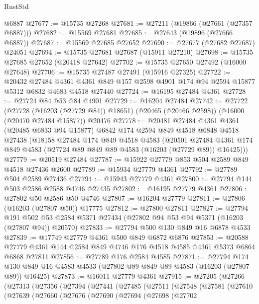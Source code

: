 \begin{lexlean}{RustStd}
\begin{coremodule}
    @6887
@27677 := @15735 @27268
@27681 := @27211 (@19866 (@27661 (@27357 @6887)))
@27682 := @15569 @27681
@27685 := @27643 (@19896 (@27666 @6887))
@27687 := @15569 @27685 @27652
@27690 := @27677 (@27682 @27687) @24051
@27694 := @15735 @27681 @27687 (@15911 @27210)
@27698 := @15735 @27685 @27652 (@20418 @27642)
@27702 := @15735 @27650 @27492 (@16000 @27648)
@27706 := @15735 @27487 @27491 (@15916 @27325)
@27722 := @20432
    @27484
    @4361
    @4361
    @849
    @157
    @2598
    @4901
    @174
    @94
    @2594
    @15877
    @5312
    @6832
    @4683
    @4518
    @27440
@27724 := @16195 @27484 @4361
@27728 := @27724 @84 @53 @84 @4901
@27729 := @16204 @27484
@27742 := @27722
    (@27728 (@16203 (@27729 @84)) @18651)
    (@20465 (@20466 @2598))
    (@16000 (@20470 @27484 @15877))
    @20476
@27778 := @20481
    @27484
    @4361
    @4361
    (@20485 @6833 @94 @15877)
    @6842
    @174
    @2594
    @849
    @4518
    @6848
    @4518
    @27438
    (@18158
      @27484
      @174
      @849
      @4518
      @4583
      (@20501
        @27484
        @4361
        @174
        @849
        @4583
        (@27724 @89 @849 @89 @4583 (@16203 (@27729 @89)) @16425)))
@27779 := @20519 @27484
@27787 := @15922 @27779 @853 @504 @2589 @849 @4518 @27436 @2600
@27789 := @15934 @27779 @4361
@27792 := @27789 @504 @2589 @27436
@27794 := @15943 @27779 @4361
@27800 := @27794 @144 @503 @2586 @2588 @4746 @27435
@27802 := @16195 @27779 @4361
@27806 := @27802 @50 @2586 @50 @4746
@27807 := @16204 @27779
@27811 := @27806 (@16203 (@27807 @50)) @17775
@27812 := @27800 @27811
@27827 := @27794
    @191
    @502
    @53
    @2584
    @5371
    @27434
    (@27802 @94 @53 @94 @5371 (@16203 (@27807 @94)) @20570)
@27833 := @27794 @500 @130 @849 @16 @6878 @4533
@27839 := @17749 @27779 @4361 @500 @849 @6872 @6876
@27853 := @20588 @27779 @4361 @144 @2584 @849 @4746 @176 @4518 @4585 @4361 @5373 @6864 @6868 @27811
@27856 := @27789 @176 @2584 @4585
@27871 := @27794
    @174
    @130
    @849
    @16
    @4583
    @4533
    (@27802 @89 @849 @89 @4583 (@16203 (@27807 @89)) @16425)
@27873 := @16011 @27779 @4361
@27915 := @27205
    (@27266
      (@27313
        (@27356
          (@27394
            (@27441
              (@27485
                (@27511
                  (@27548
                    (@27581
                      (@27610
                        (@27639
                          (@27660
                            (@27676
                              (@27690
                                (@27694
                                  (@27698
                                    (@27702

\end{coremodule}
\end{lexlean}
